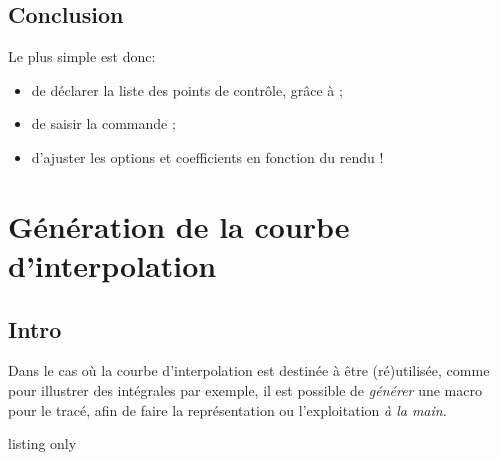 \subsection{Conclusion}

\begin{noteblock}
Le plus \og simple \fg{} est donc:
%
\begin{itemize}
	\item de déclarer la liste des points de contrôle, grâce à  ;
	\item de saisir la commande  ;
	\item d'ajuster les options et coefficients en fonction du rendu !
\end{itemize}
\vspace*{-\baselineskip}\leavevmode
\end{noteblock}

\newpage

\section{Génération de la courbe d'interpolation}\label{gensplines}

\subsection{Intro}

\begin{tipblock}
 Dans le cas où la courbe d'interpolation est destinée à être (ré)utilisée, comme pour illustrer des intégrales par exemple, il est possible de \textit{générer} une macro pour le tracé, afin de faire la représentation ou l'exploitation \textit{à la main}.
\end{tipblock}

\begin{PresCodeTexPL}{listing only}
\end{PresCodeTexPL}

